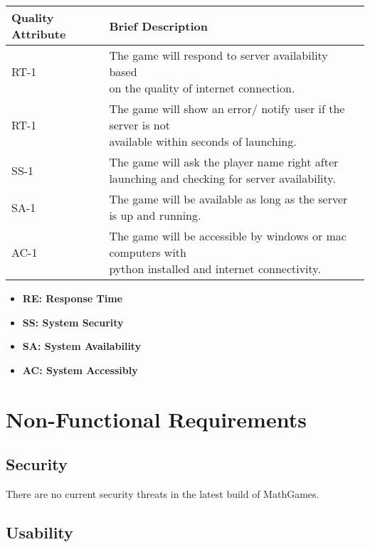 \documentclass[12pt]{article}
\begin{document}
\begin{table}[H]
\begin{tabular}{@{}|l|l|@{}}
\toprule
\textbf{Quality Attribute} & \textbf{Brief Description} \\ \midrule
RT-1 & \makecell{The game will respond to server availability based \\ on the quality of internet connection.} \\ \midrule
RT-1 & \makecell{The game will show an error/ notify user if the server is not \\ available within seconds of launching.} \\ \midrule
SS-1 & \makecell{The game will ask the player name right after \\ launching and checking for server availability.} \\ \midrule
SA-1 & The game will be available as long as the server is up and running. \\ \midrule
AC-1 & \makecell{The game will be accessible by windows or mac computers with \\ python installed and internet connectivity}. \\ \bottomrule
\end{tabular}
\end{table}

\begin{itemize}

\item \textbf{RE: Response Time}
\item \textbf{SS: System Security}
\item \textbf{SA: System Availability}
\item \textbf{AC: System Accessibly}

\end{itemize}

\newpage

\section{Non-Functional Requirements}

\subsection{Security}

There are no current security threats in the latest build of MathGames.

\subsection{Usability}
\end{document}
